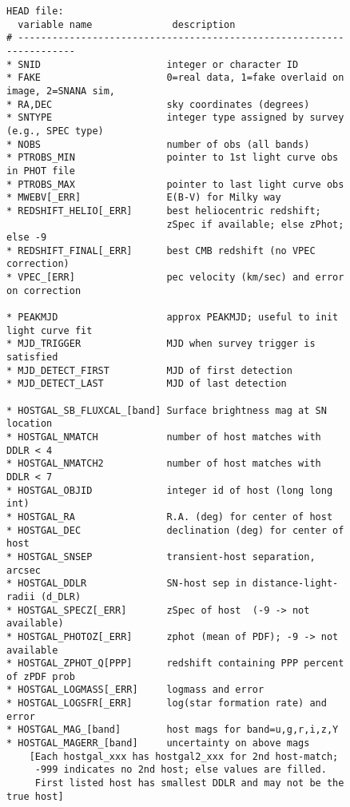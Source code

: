 \documentclass[12pt]{article}
\begin{document}
{\begin{figure} [ht] 
\begin{center}
\begin{Verbatim}[frame=single]
HEAD file:   
  variable name              description
# ---------------------------------------------------------------------
* SNID                      integer or character ID
* FAKE                      0=real data, 1=fake overlaid on image, 2=SNANA sim, 
* RA,DEC                    sky coordinates (degrees)
* SNTYPE                    integer type assigned by survey (e.g., SPEC type)
* NOBS                      number of obs (all bands)
* PTROBS_MIN                pointer to 1st light curve obs in PHOT file
* PTROBS_MAX                pointer to last light curve obs
* MWEBV[_ERR]               E(B-V) for Milky way
* REDSHIFT_HELIO[_ERR]      best heliocentric redshift;
                            zSpec if available; else zPhot; else -9
* REDSHIFT_FINAL[_ERR]      best CMB redshift (no VPEC correction)
* VPEC_[ERR]                pec velocity (km/sec) and error on correction

* PEAKMJD                   approx PEAKMJD; useful to init light curve fit
* MJD_TRIGGER               MJD when survey trigger is satisfied
* MJD_DETECT_FIRST          MJD of first detection
* MJD_DETECT_LAST           MJD of last detection

* HOSTGAL_SB_FLUXCAL_[band] Surface brightness mag at SN location
* HOSTGAL_NMATCH            number of host matches with DDLR < 4
* HOSTGAL_NMATCH2           number of host matches with DDLR < 7
* HOSTGAL_OBJID             integer id of host (long long int)
* HOSTGAL_RA                R.A. (deg) for center of host
* HOSTGAL_DEC               declination (deg) for center of host
* HOSTGAL_SNSEP             transient-host separation, arcsec
* HOSTGAL_DDLR              SN-host sep in distance-light-radii (d_DLR)
* HOSTGAL_SPECZ[_ERR]       zSpec of host  (-9 -> not available)
* HOSTGAL_PHOTOZ[_ERR]      zphot (mean of PDF); -9 -> not available
* HOSTGAL_ZPHOT_Q[PPP]      redshift containing PPP percent of zPDF prob
* HOSTGAL_LOGMASS[_ERR]     logmass and error
* HOSTGAL_LOGSFR[_ERR]      log(star formation rate) and error
* HOSTGAL_MAG_[band]        host mags for band=u,g,r,i,z,Y
* HOSTGAL_MAGERR_[band]     uncertainty on above mags
    [Each hostgal_xxx has hostgal2_xxx for 2nd host-match;
     -999 indicates no 2nd host; else values are filled.
     First listed host has smallest DDLR and may not be the true host]
    

\end{Verbatim}
\end{center}
\end{figure}}
\end{document}
